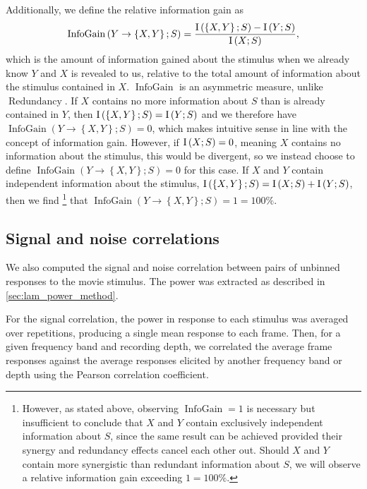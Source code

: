 Additionally, we define the relative information gain as
\begin{equation}
\label{eq:infogain}
\operatorname{InfoGain}\left(Y\to\left\{X,Y\right\};S\right)=\frac{
\operatorname{I}\left(\left\{X,Y\right\};S\right) - \operatorname{I}\left(Y;S\right)
}{
\operatorname{I}\left(X;S\right)
},
\end{equation}
which is the amount of information gained about the stimulus when we already know $Y$ and $X$ is revealed to us, relative to the total amount of information about the stimulus contained in $X$.
$\operatorname{InfoGain}$ is an asymmetric measure, unlike $\operatorname{Redundancy}$.
If $X$ contains no more information about $S$ than is already contained in $Y$, then
$\operatorname{I}\left(\left\{X,Y\right\};S\right) = \operatorname{I}\left(Y;S\right)$
and we therefore have
$\operatorname{InfoGain}\left(Y\to\left\{X,Y\right\};S\right)=0$,
which makes intuitive sense in line with the concept of information gain.
However, if $\operatorname{I}\left(X;S\right)=0$, meaning $X$ contains no information about the stimulus, this would be divergent, so we instead choose to define
$\operatorname{InfoGain}\left(Y\to\left\{X,Y\right\};S\right)=0$
for this case.
If $X$ and $Y$ contain independent information about the stimulus,
$\operatorname{I}\left(\left\{X,Y\right\};S\right) = \operatorname{I}\left(X;S\right) + \operatorname{I}\left(Y;S\right)$,
then we find%
\footnote{
However, as stated above, observing
$\operatorname{InfoGain} = 1$
is necessary but insufficient to conclude that $X$ and $Y$ contain exclusively independent information about $S$, since the same result can be achieved provided their synergy and redundancy effects cancel each other out.
Should $X$ and $Y$ contain more synergistic than redundant information about $S$, we will observe a relative information gain exceeding $1 = 100\%$.
}
that
$
\operatorname{InfoGain}\left(Y\to\left\{X,Y\right\};S\right) = 1 = 100\%
$.


\subsection{Signal and noise correlations}

We also computed the signal and noise correlation between pairs of unbinned responses to the movie stimulus.
The power was extracted as described in \autoref{sec:lam_power_method}.

For the signal correlation, the power in response to each stimulus was averaged over repetitions, producing a single mean response to each frame.
Then, for a given frequency band and recording depth, we correlated the average frame responses against the average responses elicited by another frequency band or depth using the Pearson correlation coefficient.

